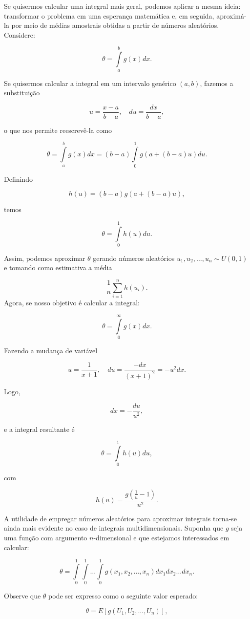 \documentclass[
  letterpaper,
  DIV=11,
  numbers=noendperiod]{scrreprt}
\begin{document}
Se quisermos calcular uma integral mais geral, podemos aplicar a mesma
ideia: transformar o problema em uma esperança matemática e, em seguida,
aproximá-la por meio de médias amostrais obtidas a partir de números
aleatórios. Considere:

\[\theta = \int\limits_{a}^{b}g(x) dx.\]

Se quisermos calcular a integral em um intervalo genérico \((a, b)\),
fazemos a substituição

\[u = \frac{x - a}{b-a}, \quad du = \frac{dx}{b-a},\]

o que nos permite reescrevê-la como

\[\theta = \int\limits_{a}^{b}g(x) dx = (b-a)\int\limits_{0}^{1}g(a + (b-a)u) du.\]

Definindo

\[h(u) = (b-a)g(a + (b-a)u),\]

temos

\[\theta = \int\limits_{0}^{1}h(u) du.\]

Assim, podemos aproximar \(\theta\) gerando números aleatórios
\(u_1, u_2, \dots, u_n \sim U(0, 1)\) e tomando como estimativa a média

\[\frac{1}{n}\sum\limits_{i=1}^{n}h(u_i).\] Agora, se nosso objetivo é
calcular a integral:

\[\theta = \int\limits_{0}^{\infty}g(x) dx.\]

Fazendo a mudança de variável

\[u = \frac{1}{x+1}, \quad du = \frac{-dx}{(x+1)^2} = -u^2 dx.\]

Logo,

\[dx = -\frac{du}{u^2},\]

e a integral resultante é

\[\theta = \int\limits_{0}^{1}h(u) du,\]

com

\[h(u) = \frac{g\left(\frac{1}{u} - 1\right)}{u^2}.\]

A utilidade de empregar números aleatórios para aproximar integrais
torna-se ainda mais evidente no caso de integrais multidimensionais.
Suponha que \(g\) seja uma função com argumento \(n\)-dimensional e que
estejamos interessados em calcular:

\[\theta = \int\limits_{0}^{1}\int\limits_{0}^{1}\dots\int\limits_{0}^{1} g(x_1, x_2, \dots, x_n)dx_1 dx_2 \dots dx_n.\]

Observe que \(\theta\) pode ser expresso como o seguinte valor esperado:

\[\theta = E[g(U_1, U_2, \dots, U_n)],\]
\end{document}
